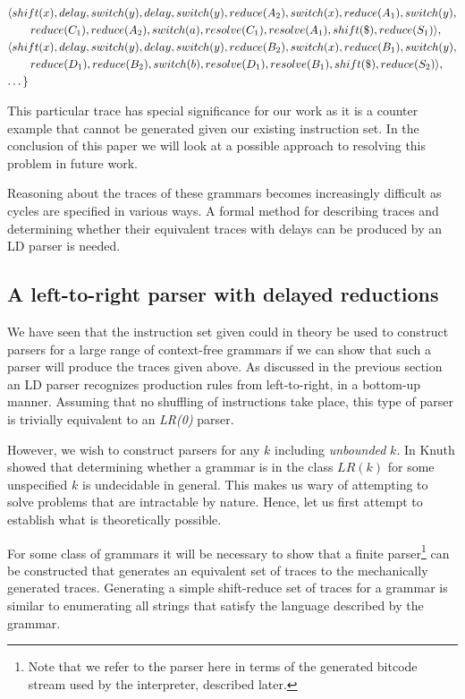 \documentclass[envcountsame,runningheads]{llncs}
\begin{document}
{{\begin{align*}
   & \langle shift(x), delay, switch(y), delay, switch(y), reduce(A_2), switch(x), reduce(A_1), switch(y), \\ & \qquad reduce(C_1), reduce(A_2), switch(a), resolve(C_1), resolve(A_1), shift(\$), reduce(S_1) \rangle,\\
   & \langle shift(x), delay, switch(y), delay, switch(y), reduce(B_2), switch(x), reduce(B_1), switch(y), \\ & \qquad reduce(D_1), reduce(B_2), switch(b), resolve(D_1), resolve(B_1), shift(\$), reduce(S_2) \rangle,\\
   & \textellipsis \}
\end{align*}}}

This particular trace has special significance for our work as it is a counter example that cannot be generated given our existing instruction set.
In the conclusion of this paper we will look at a possible approach to resolving this problem in future work.

Reasoning about the traces of these grammars becomes increasingly difficult as cycles are specified in various ways.
A formal method for describing traces and determining whether their equivalent traces with delays can be produced by an LD parser is needed.

\subsection{A left-to-right parser with delayed reductions}
We have seen that the instruction set given could in theory be used to construct parsers for a large range of context-free grammars if we can show that such a parser will produce the traces given above.
As discussed in the previous section an LD parser recognizes production rules from left-to-right, in a bottom-up manner. 
Assuming that no shuffling of instructions take place, this type of parser is trivially equivalent to an \emph{LR(0)} parser.

However, we wish to construct parsers for any $k$ including \emph{unbounded} $k$. In \cite{knuth65} Knuth showed that determining whether a grammar is in the class $LR(k)$ for some unspecified $k$ is undecidable in general. 
This makes us wary of attempting to solve problems that are intractable by nature. 
Hence, let us first attempt to establish what is theoretically possible.

For some class of grammars it will be necessary to show that a finite parser\footnote{Note that we refer to the parser here in terms of the generated bitcode stream used by the interpreter, described later.} can be constructed that generates an equivalent set of traces to the mechanically generated traces.
Generating a simple shift-reduce set of traces for a grammar is similar to enumerating all strings that satisfy the language described by the grammar.
\end{document}
